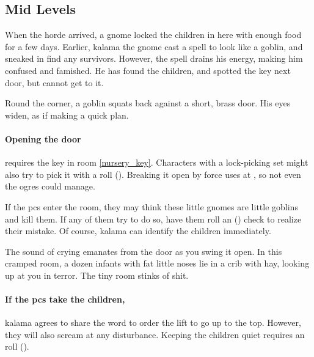 \subsection{Mid Levels}


\begin{exampletext}
  When the horde arrived, a gnome locked the children in here with enough food for a few days.
  Earlier, \gls{kalama} the gnome cast a spell to look like a goblin, and sneaked in find any survivors.
  However, the spell drains his energy, making him confused and famished.
  He has found the children, and spotted the key next door, but cannot get to it.
\end{exampletext}


\begin{boxtext}
  Round the corner, a goblin squats back against a short, brass door.
  His eyes widen, as if making a quick plan.
\end{boxtext}

\paragraph{Opening the door}
requires the key in room \vref{nursery_key}.
Characters with a lock-picking set might also try to pick it with a  roll (\tn[11]).
Breaking it open by force uses  at \tn[20], so not even the ogres could manage.

If the \glspl{pc} enter the room, they may think these little gnomes are little goblins and kill them.
If any of them try to do so, have them roll an  (\tn[8]) check to realize their mistake.
Of course, \gls{kalama} can identify the children immediately.

\begin{boxtext}
  The sound of crying emanates from the door as you swing it open.
  In this cramped room, a dozen infants with fat little noses lie in a crib with hay, looking up at you in terror.
  The tiny room stinks of shit.
\end{boxtext}

\paragraph{If the \glspl{pc} take the children,}
\gls{kalama} agrees to share the word to order the lift to go up to the top.
However, they will also scream at any disturbance.
Keeping the children quiet requires an  roll (\tn[10]).

